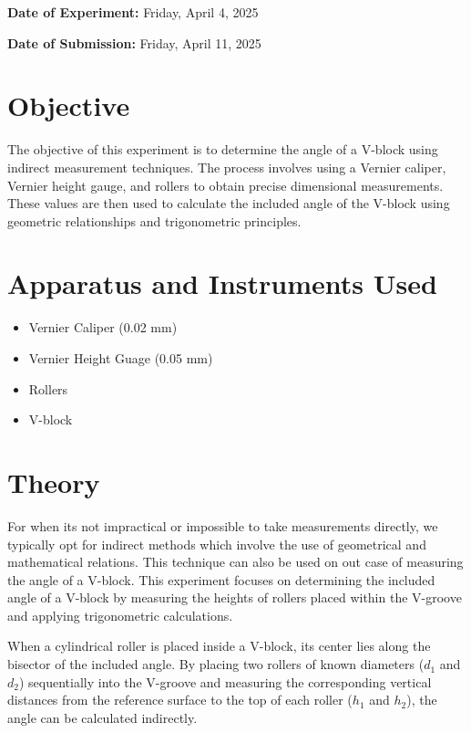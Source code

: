 \documentclass[12pt]{article}
\begin{document}
\begin{titlepage}
	\textbf{Date of Experiment:} Friday, April 4, 2025

	\textbf{Date of Submission:} Friday, April 11, 2025
\end{titlepage}

\tableofcontents
\newpage

\section{Objective}
The objective of this experiment is to determine the angle of a V-block using indirect measurement techniques. The process involves using a Vernier caliper, Vernier height gauge, and rollers to obtain precise dimensional measurements. These values are then used to calculate the included angle of the V-block using geometric relationships and trigonometric principles.


\section{Apparatus and Instruments Used}
\begin{itemize}
	\item Vernier Caliper (0.02 mm)
	\item Vernier Height Guage (0.05 mm)
	\item Rollers
	\item V-block
\end{itemize}
\section{Theory}
For when its not impractical or impossible to take measurements directly, we typically opt for indirect methods which involve the use of geometrical and mathematical relations. This technique can also be used on out case of measuring the angle of a V-block. This experiment focuses on determining the included angle of a V-block by measuring the heights of rollers placed within the V-groove and applying trigonometric calculations.

When a cylindrical roller is placed inside a V-block, its center lies along the bisector of the included angle. By placing two rollers of known diameters ($d_1$ and $d_2$) sequentially into the V-groove and measuring the corresponding vertical distances from the reference surface to the top of each roller ($h_1$ and $h_2$), the angle can be calculated indirectly.
\end{document}
